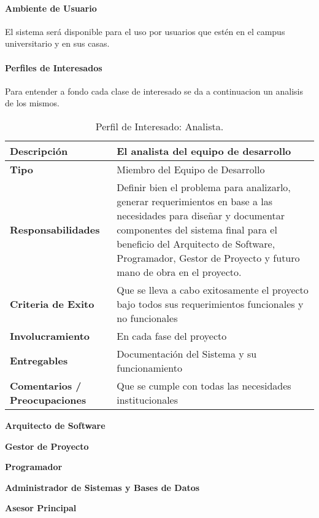 \paragraph{Ambiente de Usuario}
El sistema será disponible para el uso por usuarios que estén en el campus universitario y en sus casas.

\paragraph{Perfiles de Interesados}
Para entender a fondo cada clase de interesado se da a continuacion un analisis de los mismos.

\begin{table}[h!]
  \begin{tabular}{|p{}|p{}|}
    \hline
    \textbf{Descripción} & El analista del equipo de desarrollo \\
    \hline
    \textbf{Tipo} & Miembro del Equipo de Desarrollo \\
    \hline
    \textbf{Responsabilidades} & Definir bien el problema para analizarlo, generar requerimientos en base a las necesidades para diseñar y documentar componentes del sistema final para el beneficio del Arquitecto de Software, Programador, Gestor de Proyecto y futuro mano de obra en el proyecto. \\
    \hline
    \textbf{Criteria de Exito} & Que se lleva a cabo exitosamente el proyecto bajo todos sus requerimientos funcionales y no funcionales \\
    \hline
    \textbf{Involucramiento} & En cada fase del proyecto \\
    \hline
    \textbf{Entregables} & Documentación del Sistema y su funcionamiento \\
    \hline
    \textbf{Comentarios / Preocupaciones} & Que se cumple con todas las necesidades institucionales \\
    \hline
  \end{tabular}
  \caption{Perfil de Interesado: Analista.}
  \label{per-inter-analista}
\end{table}

\textbf{Arquitecto de Software}

\textbf{Gestor de Proyecto}

\textbf{Programador}

\textbf{Administrador de Sistemas y Bases de Datos}

\textbf{Asesor Principal}

